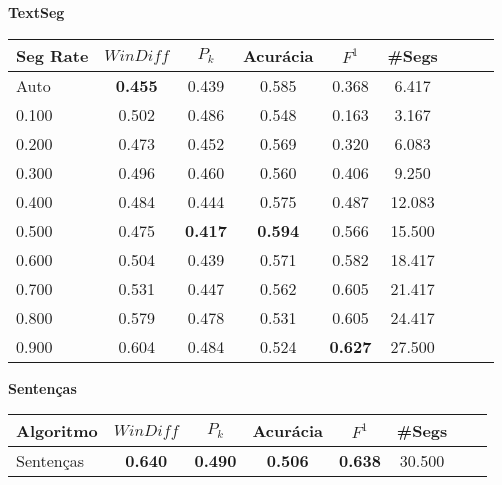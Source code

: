 







\center
\textbf{TextSeg}  
 \begin{longtable}[c]{|l|c|c|c|c|c|c|c|c|} 
\hline 
Seg Rate & $WinDiff$ & $P_k$ & Acurácia & $F^1$ & \#Segs\\ \hline 
Auto & \cellcolor{gray!20} \textbf{0.455} & 0.439 & 0.585 & 0.368 & 6.417  \\ \hline 
0.100 & 0.502 & 0.486 & 0.548 & 0.163 & 3.167  \\ \hline 
0.200 & 0.473 & 0.452 & 0.569 & 0.320 & 6.083  \\ \hline 
0.300 & 0.496 & 0.460 & 0.560 & 0.406 & 9.250  \\ \hline 
0.400 & 0.484 & 0.444 & 0.575 & 0.487 & 12.083  \\ \hline 
0.500 & 0.475 & \cellcolor{gray!20} \textbf{0.417} & \cellcolor{gray!20} \textbf{0.594} & 0.566 & 15.500  \\ \hline 
0.600 & 0.504 & 0.439 & 0.571 & 0.582 & 18.417  \\ \hline 
0.700 & 0.531 & 0.447 & 0.562 & 0.605 & 21.417  \\ \hline 
0.800 & 0.579 & 0.478 & 0.531 & 0.605 & 24.417  \\ \hline 
0.900 & 0.604 & 0.484 & 0.524 & \cellcolor{gray!20} \textbf{0.627} & 27.500  \\ \hline 
 \end{longtable} 






\center
\textbf{Sentenças}  
\begin{longtable}[c]{|l|c|c|c|c|c|c|c|} 
\hline 
Algoritmo & $WinDiff$ & $P_k$ & Acurácia & $F^1$ & \#Segs\\ \hline 
Sentenças & \cellcolor{gray!20} \textbf{0.640} & \cellcolor{gray!20} \textbf{0.490} & \cellcolor{gray!20} \textbf{0.506} & \cellcolor{gray!20} \textbf{0.638} & 30.500  \\ \hline 
 \end{longtable} 

